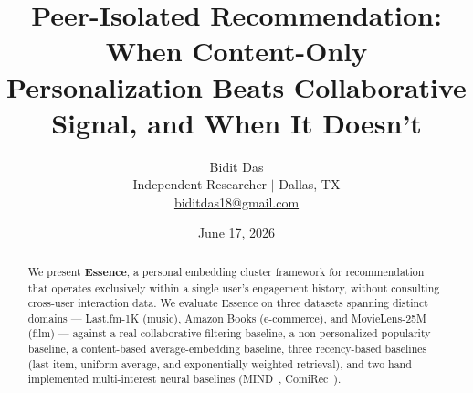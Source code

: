 \documentclass[11pt,a4paper]{article}
\title{
    \Large\textbf{Peer-Isolated Recommendation: When Content-Only}\\[4pt]
    \Large\textbf{Personalization Beats Collaborative Signal, and When It Doesn't}
}
\author{
    Bidit Das\\
    \small Independent Researcher $\mid$ Dallas, TX\\
    \small \href{mailto:biditdas18@gmail.com}{biditdas18@gmail.com}
}
\date{June 17, 2026}
\begin{document}
\maketitle

\begin{abstract}
We present \textbf{Essence}, a personal embedding cluster framework for
recommendation that operates exclusively within a single user's engagement
history, without consulting cross-user interaction data. We evaluate
Essence on three datasets spanning distinct domains --- Last.fm-1K (music),
Amazon Books (e-commerce), and MovieLens-25M (film) --- against a real
collaborative-filtering baseline, a non-personalized popularity baseline, a
content-based average-embedding baseline, three recency-based baselines
(last-item, uniform-average, and exponentially-weighted retrieval), and two
hand-implemented multi-interest neural baselines (MIND~\cite{li2019},
ComiRec~\cite{cen2020}).


\end{abstract}
\end{document}

